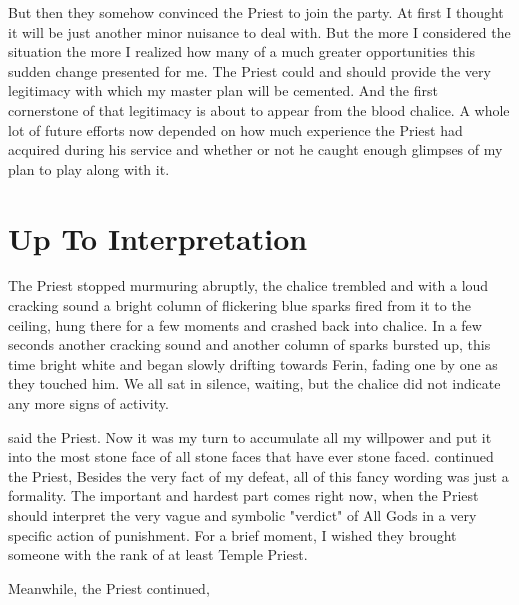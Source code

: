But then they somehow convinced the Priest to join the party. At first I thought it will be just another minor nuisance to deal with. But the more I considered the situation the more I realized how many of a much greater opportunities this sudden change presented for me. The Priest could and should provide the very legitimacy with which my master plan will be cemented. And the first cornerstone of that legitimacy is about to appear from the blood chalice. A whole lot of future efforts now depended on how much experience the Priest had acquired during his service and whether or not he caught enough glimpses of my plan to play along with it.

\section{Up To Interpretation}

The Priest stopped murmuring abruptly, the chalice trembled and with a loud cracking sound a bright column of flickering blue sparks fired from it to the ceiling, hung there for a few moments and crashed back into chalice. In a few seconds another cracking sound and another column of sparks bursted up, this time bright white and began slowly drifting towards Ferin, fading one by one as they touched him. We all sat in silence, waiting, but the chalice did not indicate any more signs of activity.

 said the Priest. Now it was my turn to accumulate all my willpower and put it into the most stone face of all stone faces that have ever stone faced.  continued the Priest,  Besides the very fact of my defeat, all of this fancy wording was just a formality. The important and hardest part comes right now, when the Priest should interpret the very vague and symbolic "verdict" of All Gods in a very specific action of punishment. For a brief moment, I wished they brought someone with the rank of at least Temple Priest.

Meanwhile, the Priest continued, 

